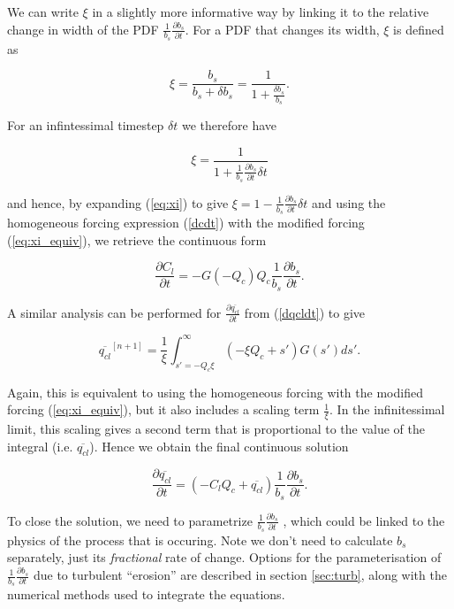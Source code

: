 \documentclass{UMDP_article}
\begin{document}
We can write $\xi$ in a slightly more
informative way by linking it to the relative change in width of the PDF
$\frac{1}{b_s} \frac{\partial b_s}{\partial t}$. For a PDF that changes
its width, $\xi$ is defined as

\begin{equation}
\xi = \frac{b_s}{b_s + \delta b_s} = \frac{1}{1 + \frac{\delta b_s}{b_s}}.
\label{eq:xi_equiv1}
\end{equation}


For an infintessimal timestep $\delta t$ we therefore have

\begin{equation}
\xi = \frac{1}{1 + \frac{1}{b_s} \frac{\partial b_s}{\partial t} \delta t }
\label{eq:xi}
\end{equation}

and hence, by expanding (\ref{eq:xi}) to give $\xi = 1 -  \frac{1}{b_s}
\frac{\partial b_s}{\partial t} \delta t$ and using the homogeneous
forcing expression (\ref{dcdt}) with the modified forcing (\ref{eq:xi_equiv}),
we retrieve the continuous form

\begin{equation}
\frac{\partial C_l}{\partial t} = - G(-Q_c) Q_c \frac{1}{b_s}
\frac{\partial b_s}{\partial t} .
\label{eq:dcdt_width}
\end{equation}

A similar analysis can be performed for $\frac{\partial \overline{q_{cl}}}
{\partial t}$ from (\ref{dqcldt}) to give

\begin{equation}
\overline{q_{cl}}^{[n+1]} = \frac{1}{\xi} \int_{s'=-Q_c \xi}^{\infty}
(- \xi Q_c + s') G(s') ds' .
\label{eq:qcl_xi2}
\end{equation}

Again, this is equivalent to using the homogeneous forcing with the modified
forcing (\ref{eq:xi_equiv}), but it also includes a scaling
term $\frac{1}{\xi}$. In the infinitessimal limit, this scaling gives
a second term that is proportional to the value of the integral (i.e.
$\overline{q_{cl}}$). Hence we obtain the final continuous solution

\begin{equation}
\frac{\partial \overline{q_{cl}}}{\partial t} =
(- C_l Q_c+\overline{q_{cl}}) \frac{1}{b_s} \frac{\partial b_s}{\partial t} .
\label{eq:dqcldt_width}
\end{equation}

To close the solution, we need to parametrize $\frac{1}{b_s}
\frac{\partial b_s}{\partial t}$ ,
which could be linked to the physics of the process that is occuring. Note
we don't need to calculate $b_s$ separately, just its \textit{fractional}
rate of change.  Options for the parameterisation of
$\frac{1}{b_s}\frac{\partial b_s}{\partial t}$
due to turbulent ``erosion'' are described in section \ref{sec:turb},
along with the numerical methods used to integrate the equations.
\end{document}
